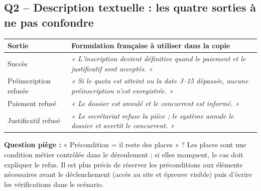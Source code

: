 \documentclass[10pt,a4paper]{article}
\begin{document}
\subsection{Q2 -- Description textuelle : les quatre sorties à ne pas confondre}
\begin{tabularx}{\linewidth}{@{}p{27mm}X@{}}\toprule
Sortie & Formulation française à utiliser dans la copie \\ \midrule
Succès & \textit{« L'inscription devient définitive quand le paiement et le justificatif sont acceptés. »}\\
Préinscription refusée & \textit{« Si le quota est atteint ou la date J--15 dépassée, aucune préinscription n'est enregistrée. »}\\
Paiement refusé & \textit{« Le dossier est annulé et le concurrent est informé. »}\\
Justificatif refusé & \textit{« Le secrétariat refuse la pièce ; le système annule le dossier et avertit le concurrent. »}\\
\bottomrule\end{tabularx}
\textbf{Question piège :} « Précondition = il reste des places » ? Les places sont une condition métier contrôlée dans le déroulement ; si elles manquent, le cas doit expliquer le refus. Il est plus précis de réserver les préconditions aux éléments nécessaires avant le déclenchement (accès au site et épreuve visible) puis d'écrire les vérifications dans le scénario.
\newpage
\end{document}
